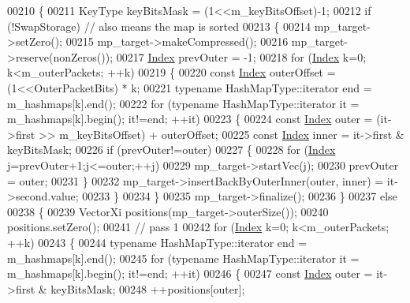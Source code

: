 \begin{DoxyCode}
00210     \{
00211       KeyType keyBitsMask = (1<<m\_keyBitsOffset)-1;
00212       \textcolor{keywordflow}{if} (!SwapStorage) \textcolor{comment}{// also means the map is sorted}
00213       \{
00214         mp\_target->setZero();
00215         mp\_target->makeCompressed();
00216         mp\_target->reserve(nonZeros());
00217         \hyperlink{namespace_eigen_a62e77e0933482dafde8fe197d9a2cfde}{Index} prevOuter = -1;
00218         \textcolor{keywordflow}{for} (\hyperlink{namespace_eigen_a62e77e0933482dafde8fe197d9a2cfde}{Index} k=0; k<m\_outerPackets; ++k)
00219         \{
00220           \textcolor{keyword}{const} \hyperlink{namespace_eigen_a62e77e0933482dafde8fe197d9a2cfde}{Index} outerOffset = (1<<OuterPacketBits) * k;
00221           \textcolor{keyword}{typename} HashMapType::iterator end = m\_hashmaps[k].end();
00222           \textcolor{keywordflow}{for} (\textcolor{keyword}{typename} HashMapType::iterator it = m\_hashmaps[k].begin(); it!=end; ++it)
00223           \{
00224             \textcolor{keyword}{const} \hyperlink{namespace_eigen_a62e77e0933482dafde8fe197d9a2cfde}{Index} outer = (it->first >> m\_keyBitsOffset) + outerOffset;
00225             \textcolor{keyword}{const} \hyperlink{namespace_eigen_a62e77e0933482dafde8fe197d9a2cfde}{Index} inner = it->first & keyBitsMask;
00226             \textcolor{keywordflow}{if} (prevOuter!=outer)
00227             \{
00228               \textcolor{keywordflow}{for} (\hyperlink{namespace_eigen_a62e77e0933482dafde8fe197d9a2cfde}{Index} j=prevOuter+1;j<=outer;++j)
00229                 mp\_target->startVec(j);
00230               prevOuter = outer;
00231             \}
00232             mp\_target->insertBackByOuterInner(outer, inner) = it->second.value;
00233           \}
00234         \}
00235         mp\_target->finalize();
00236       \}
00237       \textcolor{keywordflow}{else}
00238       \{
00239         VectorXi positions(mp\_target->outerSize());
00240         positions.setZero();
00241         \textcolor{comment}{// pass 1}
00242         \textcolor{keywordflow}{for} (\hyperlink{namespace_eigen_a62e77e0933482dafde8fe197d9a2cfde}{Index} k=0; k<m\_outerPackets; ++k)
00243         \{
00244           \textcolor{keyword}{typename} HashMapType::iterator end = m\_hashmaps[k].end();
00245           \textcolor{keywordflow}{for} (\textcolor{keyword}{typename} HashMapType::iterator it = m\_hashmaps[k].begin(); it!=end; ++it)
00246           \{
00247             \textcolor{keyword}{const} \hyperlink{namespace_eigen_a62e77e0933482dafde8fe197d9a2cfde}{Index} outer = it->first & keyBitsMask;
00248             ++positions[outer];

\end{DoxyCode}
